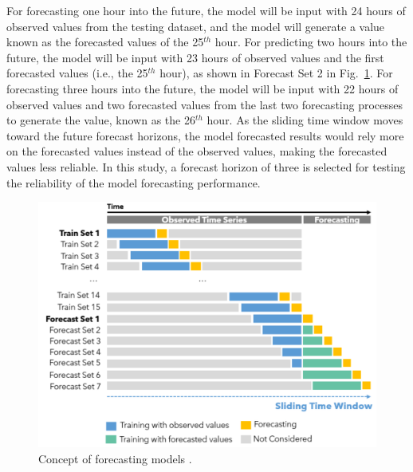 For forecasting one hour into the future, the model will be input with 24 hours of observed values from the testing dataset, and the model will generate a value known as the forecasted values of the 25$^{th}$ hour. For predicting two hours into the future, the model will be input with 23 hours of observed values and the first forecasted values (i.e., the 25$^{th}$ hour), as shown in Forecast Set 2 in Fig.~\ref{fig:forecast-concept}. For forecasting three hours into the future, the model will be input with 22 hours of observed values and two forecasted values from the last two forecasting processes to generate the value, known as the 26$^{th}$ hour. As the sliding time window moves toward the future forecast horizons, the model forecasted results would rely more on the forecasted values instead of the observed values, making the forecasted values less reliable. In this study, a forecast horizon of three is selected for testing the reliability of the model forecasting performance.

\begin{figure}[!ht]
  \centering
  \includegraphics[width=0.9\columnwidth]{imgs/forecast-concept.png}
  \caption{Concept of forecasting models \citep{liuTimeSeriesForecasting2020}.}
  \label{fig:forecast-concept}
\end{figure}

